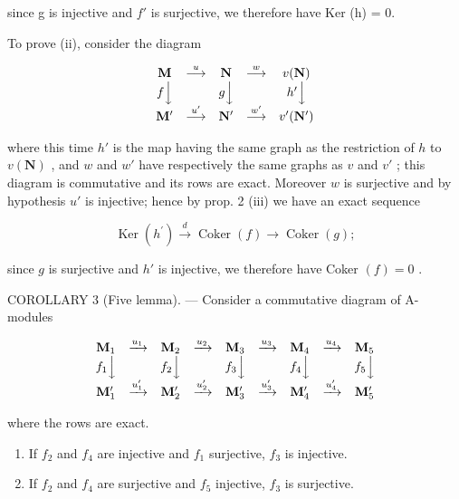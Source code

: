 since g is injective and \(f'\) is surjective, we therefore have Ker (h) = 0.

To prove (ii), consider the diagram

\[
\begin{array}{c c c c c} \mathbf {M} & \stackrel {{u}} {{\longrightarrow}} & \mathbf {N} & \stackrel {{w}} {{\longrightarrow}} & v (\mathbf {N}) \\ f \Big \downarrow & & g \Big \downarrow & & h ^ {\prime} \Big \downarrow \\ \mathbf {M} ^ {\prime} & \stackrel {{u ^ {\prime}}} {{\longrightarrow}} & \mathbf {N} ^ {\prime} & \stackrel {{w ^ {\prime}}} {{\longrightarrow}} & v ^ {\prime} (\mathbf {N} ^ {\prime}) \end{array}
\]

where this time \(h'\) is the map having the same graph as the restriction of \(h\) to \(v(\mathbf{N})\) , and \(w\) and \(w'\) have respectively the same graphs as \(v\) and \(v'\) ; this diagram is commutative and its rows are exact. Moreover \(w\) is surjective and by hypothesis \(u'\) is injective; hence by prop. 2 (iii) we have an exact sequence

\[
\operatorname{Ker} \left(h ^ {\prime}\right) \xrightarrow {d} \operatorname{Coker} (f) \longrightarrow \operatorname{Coker} (g);
\]

since \(g\) is surjective and \(h'\) is injective, we therefore have Coker \((f) = 0\) .

COROLLARY 3 (Five lemma). --- Consider a commutative diagram of A-modules

\[
\begin{array}{c c c c c c c c c} \mathbf {M} _ {1} & \xrightarrow {u _ {1}} & \mathbf {M} _ {2} & \xrightarrow {u _ {2}} & \mathbf {M} _ {3} & \xrightarrow {u _ {3}} & \mathbf {M} _ {4} & \xrightarrow {u _ {4}} & \mathbf {M} _ {5} \\ f _ {1} \Big \downarrow & & f _ {2} \Big \downarrow & & f _ {3} \Big \downarrow & & f _ {4} \Big \downarrow & & f _ {5} \Big \downarrow \\ \mathbf {M} _ {1} ^ {\prime} & \xrightarrow {u _ {1} ^ {\prime}} & \mathbf {M} _ {2} ^ {\prime} & \xrightarrow {u _ {2} ^ {\prime}} & \mathbf {M} _ {3} ^ {\prime} & \xrightarrow {u _ {3} ^ {\prime}} & \mathbf {M} _ {4} ^ {\prime} & \xrightarrow {u _ {4} ^ {\prime}} & \mathbf {M} _ {5} ^ {\prime} \end{array}
\]

where the rows are exact.

\begin{enumerate}
\def\labelenumi{(\roman{enumi})}
\item
  If \(f_{2}\) and \(f_{4}\) are injective and \(f_{1}\) surjective, \(f_{3}\) is injective.
\item
  If \(f_{2}\) and \(f_{4}\) are surjective and \(f_{5}\) injective, \(f_{3}\) is surjective.
\end{enumerate}

